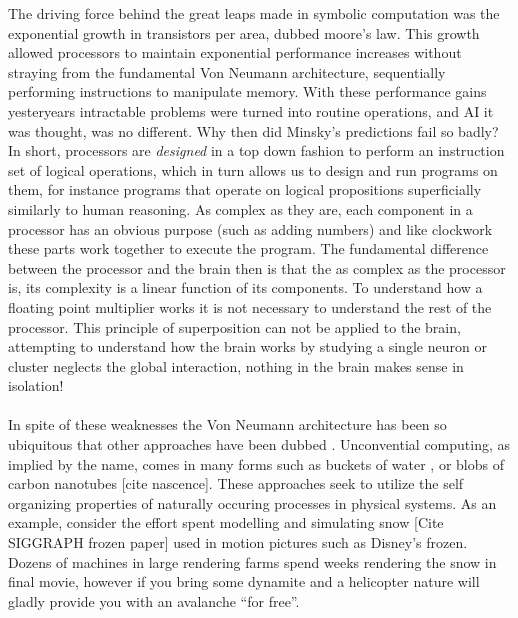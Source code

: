 The driving force behind the great leaps made in symbolic computation was the
exponential growth in transistors per area, dubbed moore's law.
This growth allowed processors to maintain exponential performance increases
without straying from the fundamental Von Neumann architecture, sequentially
performing instructions to manipulate memory.
With these performance gains yesteryears intractable problems were turned into
routine operations, and AI it was thought, was no different. Why then did Minsky's
predictions fail so badly?
In short, processors are \emph{designed} in a top down fashion to perform
an instruction set of logical operations, which in turn allows us to design and run programs on them,
for instance programs that operate on logical propositions superficially
similarly to human reasoning.
As complex as they are, each component in a processor has an obvious purpose
(such as adding numbers) and like clockwork these parts work together to execute
the program.
The fundamental difference between the processor and the brain then is that the
as complex as the processor is, its complexity is a linear function of its
components. To understand how a floating point multiplier works it is not
necessary to understand the rest of the processor. This principle of
superposition can not be applied to the brain, attempting to understand how the
brain works by studying a single neuron or cluster neglects the global
interaction, nothing in the brain makes sense in isolation!
\\ \\
In spite of these weaknesses the Von Neumann architecture has been so ubiquitous
that other approaches have been dubbed \cite{Unconventional Computing}.
Unconvential computing, as implied by the name, comes in many forms such as
buckets of water \cite{fernando_pattern_2003}, or blobs of carbon nanotubes
[cite nascence]. 
These approaches seek to utilize the self organizing properties of naturally
occuring processes in physical systems.
As an example, consider the effort spent modelling and simulating snow [Cite SIGGRAPH frozen
paper] used in motion pictures such as Disney's frozen. Dozens of machines in
large rendering farms spend weeks rendering the snow in final movie, however if
you bring some dynamite and a helicopter nature will gladly provide you with an
avalanche ``for free''.\\
